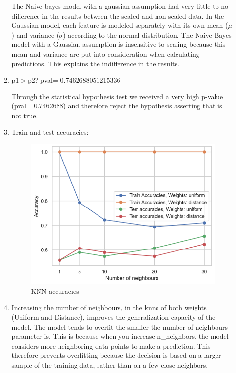 \documentclass{article}
\begin{document}
\begin{enumerate}[leftmargin=\labelsep]
\begin{enumerate}
The Naive bayes model with a gaussian assumption had very little to no difference in the results between the scaled and non-scaled data. In the Gaussian model, each feature is modeled separately with its own mean ($\mu$) and variance ($\sigma$) according to the normal distribution. The Naive Bayes model with a Gaussian assumption is insensitive to scaling because this mean and variance are put into consideration when calculating predictions. This explains the indifference in the results.

\item
p1$>$p2? pval= 0.7462688051215336

Through the statistical hypothesis test we received a very high p-value (pval= 0.7462688) and therefore reject the hypothesis asserting that is not true.

\item
Train and test accuracies:

    \begin{figure}[H]
        \centering
        \includegraphics[width=0.8\linewidth]{img/knn_accs.png}
        \caption{KNN accuracies}
        \label{fig:enter-label}
    \end{figure}

\item 
Increasing the number of neighbours, in the knns of both weights (Uniform and Distance), improves the generalization capacity of the model. The model tends to overfit the smaller the number of neighbours parameter is. This is because when you increase n\_neighbors, the model considers more neighboring data points to make a prediction. This therefore prevents overfitting because the decision is based on a larger sample of the training data, rather than on a few close neighbors.


\end{enumerate}
\end{enumerate}
\end{document}
